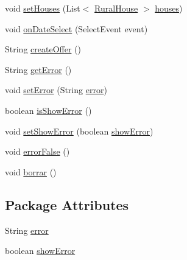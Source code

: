 \begin{DoxyCompactItemize}
\item 
void \mbox{\hyperlink{classbean_1_1Set__Bean_aa128159e71978a7593c243bba1b4e400}{set\+Houses}} (List$<$ \mbox{\hyperlink{classdomain_1_1RuralHouse}{Rural\+House}} $>$ \mbox{\hyperlink{classbean_1_1Set__Bean_af99beccb4531fab9e9e96b5277ea4b6c}{houses}})
\item 
void \mbox{\hyperlink{classbean_1_1Set__Bean_ac31222c0c170d01be178adc206724cd1}{on\+Date\+Select}} (Select\+Event event)
\item 
String \mbox{\hyperlink{classbean_1_1Set__Bean_a465bd2dc79465be5933720eadd23d137}{create\+Offer}} ()
\item 
String \mbox{\hyperlink{classbean_1_1Set__Bean_ab9e88a7d0e094271ff7f9fb337f66c11}{get\+Error}} ()
\item 
void \mbox{\hyperlink{classbean_1_1Set__Bean_a097bfd9a811dface309cd5fb0d6d839e}{set\+Error}} (String \mbox{\hyperlink{classbean_1_1Set__Bean_aa0023cab21fcce9d36c517f53940f3ff}{error}})
\item 
boolean \mbox{\hyperlink{classbean_1_1Set__Bean_a84574fb21d6564cf7af43ebaa4cf8342}{is\+Show\+Error}} ()
\item 
void \mbox{\hyperlink{classbean_1_1Set__Bean_a6fbcd7695627e1f60eddd4e35bcb288f}{set\+Show\+Error}} (boolean \mbox{\hyperlink{classbean_1_1Set__Bean_a1476ea0d0fa314e92ff99f9a9499e5c0}{show\+Error}})
\item 
void \mbox{\hyperlink{classbean_1_1Set__Bean_a627ff4ed667dd2be57ea46f8c196cda7}{error\+False}} ()
\item 
void \mbox{\hyperlink{classbean_1_1Set__Bean_a459251daa7964f459c7dd5ad67173345}{borrar}} ()
\end{DoxyCompactItemize}
\subsection*{Package Attributes}
\begin{DoxyCompactItemize}
\item 
String \mbox{\hyperlink{classbean_1_1Set__Bean_aa0023cab21fcce9d36c517f53940f3ff}{error}}
\item 
boolean \mbox{\hyperlink{classbean_1_1Set__Bean_a1476ea0d0fa314e92ff99f9a9499e5c0}{show\+Error}}
\end{DoxyCompactItemize}
